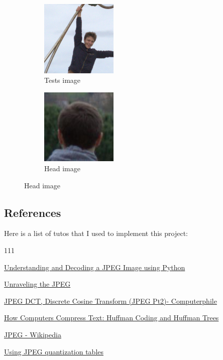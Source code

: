 \begin{figure}[H]
    \centering
    \begin{subfigure}[b]{0.4\textwidth}
        \centering
        \includegraphics[width=0.4\textwidth]{src/assets/tests/tests.png}
        \caption{Tests image}
        \label{fig:tests}
    \end{subfigure}
    \begin{subfigure}[b]{0.4\textwidth}
        \centering
        \includegraphics[width=0.4\textwidth]{src/assets/head/head.jpg}
        \caption{Head image}
        \label{fig:head}
    \end{subfigure}
\end{figure}

\subsection{References}

Here is a list of tutos that I used to implement this project:

\begin{dinglist}{111}
    \item \href{https://yasoob.me/posts/understanding-and-writing-jpeg-decoder-in-python}{Understanding and Decoding a JPEG Image using Python}
    \item \href{https://parametric.press/issue-01/unraveling-the-jpeg/}{Unraveling the JPEG}
    \item \href{https://youtu.be/JsTptu56GM8}{JPEG DCT, Discrete Cosine Transform (JPEG Pt2)- Computerphile}
    \item \href{https://youtu.be/Q2aEzeMDHMA}{How Computers Compress Text: Huffman Coding and Huffman Trees}
    \item \href{https://en.wikipedia.org/wiki/JPEG}{JPEG - Wikipedia}
    \item \href{https://www.sciencedirect.com/science/article/pii/S1742287608000285}{Using JPEG quantization tables}
\end{dinglist}
